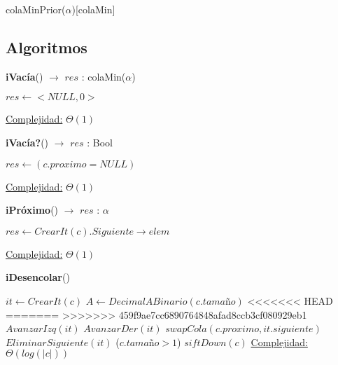 \begin{Estructura}{colaMinPrior($\alpha$)}[colaMin]
\subsection{Algoritmos}
	\lstset{style=alg}

\begin{algorithm}[H]{\textbf{iVacía}() $\to$ $res$ : colaMin($\alpha$)}
    	\begin{algorithmic}[1]
			\State $res \gets <NULL, 0>$ 
			
			\medskip
			\Statex \underline{Complejidad:} $\Theta(1)$
    	\end{algorithmic}
\end{algorithm}

\begin{algorithm}[H]{\textbf{iVacía?}() $\to$ $res$ : Bool}
    	\begin{algorithmic}[1]
			\State $res \gets (c.proximo = NULL)$ 
			
			\medskip
			\Statex \underline{Complejidad:} $\Theta(1)$
    	\end{algorithmic}
\end{algorithm}

\begin{algorithm}[H]{\textbf{iPróximo}() $\to$ $res$ : $\alpha$}
    	\begin{algorithmic}[1]
			\State $res \gets CrearIt(c).Siguiente \rightarrow elem$ 
			
			\medskip
			\Statex \underline{Complejidad:} $\Theta(1)$
    	\end{algorithmic}
\end{algorithm}

\begin{algorithm}[H]{\textbf{iDesencolar}()}
    	\begin{algorithmic}[1]
			\State $it \leftarrow CrearIt(c) $ 
			\State $A \leftarrow DecimalABinario(c.tamaño) $ 
<<<<<<< HEAD
			 
=======
			 
>>>>>>> 459f9ae7cc6890764848afad8ccb3cf080929eb1
					\State $AvanzarIzq(it) $ 
				\Else
					\State $AvanzarDer(it) $ 
				\EndIf
			\EndFor
			\State $swapCola(c.proximo, it.siguiente) $ 
			\State $EliminarSiguiente(it) $ 
			\If($c.tamaño > 1$)
				\State $siftDown(c) $ 
			\EndIf
			\medskip
			\Statex \underline{Complejidad:} $\Theta(log(|c|))$
    	\end{algorithmic}
\end{algorithm}


\end{Estructura}

